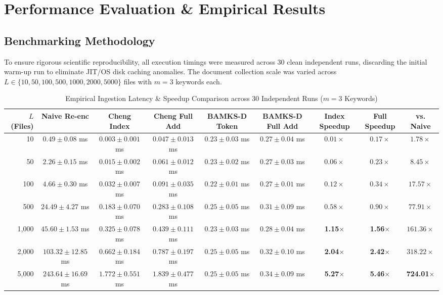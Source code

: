 \documentclass[journal,10pt,twocolumn]{IEEEtran}
\begin{document}
\section{Performance Evaluation \& Empirical Results}

\subsection{Benchmarking Methodology}
To ensure rigorous scientific reproducibility, all execution timings were measured across 30 clean independent runs, discarding the initial warm-up run to eliminate JIT/OS disk caching anomalies. The document collection scale was varied across $L \in \{10, 50, 100, 500, 1000, 2000, 5000\}$ files with $m = 3$ keywords each.

\begin{table}[t]
\caption{Empirical Ingestion Latency \& Speedup Comparison across 30 Independent Runs ($m = 3$ Keywords)}
\label{tab:benchmarks}
\centering
\begin{tabular}{rcccccccc}
\toprule
\textbf{$L$ (Files)} & \textbf{Naive Re-enc} & \textbf{Cheng Index \cite{cheng2026bamks}} & \textbf{Cheng Full Add} & \textbf{BAMKS-D Token} & \textbf{BAMKS-D Full Add} & \textbf{Index Speedup} & \textbf{Full Speedup} & \textbf{vs. Naive} \\
\midrule
10 & $0.49 \pm 0.08$ ms & $0.003 \pm 0.001$ ms & $0.047 \pm 0.013$ ms & $0.23 \pm 0.03$ ms & $0.27 \pm 0.04$ ms & $0.01\times$ & $0.17\times$ & $1.78\times$ \\
50 & $2.26 \pm 0.15$ ms & $0.015 \pm 0.002$ ms & $0.061 \pm 0.012$ ms & $0.23 \pm 0.02$ ms & $0.27 \pm 0.03$ ms & $0.06\times$ & $0.23\times$ & $8.45\times$ \\
100 & $4.66 \pm 0.30$ ms & $0.032 \pm 0.007$ ms & $0.091 \pm 0.035$ ms & $0.22 \pm 0.01$ ms & $0.27 \pm 0.01$ ms & $0.12\times$ & $0.34\times$ & $17.57\times$ \\
500 & $24.49 \pm 4.27$ ms & $0.183 \pm 0.070$ ms & $0.283 \pm 0.108$ ms & $0.25 \pm 0.05$ ms & $0.31 \pm 0.09$ ms & $0.58\times$ & $0.90\times$ & $77.91\times$ \\
1,000 & $45.60 \pm 1.53$ ms & $0.325 \pm 0.078$ ms & $0.439 \pm 0.111$ ms & $0.23 \pm 0.03$ ms & $0.28 \pm 0.04$ ms & \textbf{1.15$\times$} & \textbf{1.56$\times$} & $161.36\times$ \\
2,000 & $103.32 \pm 12.85$ ms & $0.662 \pm 0.184$ ms & $0.787 \pm 0.197$ ms & $0.25 \pm 0.05$ ms & $0.32 \pm 0.10$ ms & \textbf{2.04$\times$} & \textbf{2.42$\times$} & $318.22\times$ \\
5,000 & $243.64 \pm 16.69$ ms & $1.772 \pm 0.551$ ms & $1.839 \pm 0.477$ ms & $0.25 \pm 0.05$ ms & $0.34 \pm 0.09$ ms & \textbf{5.27$\times$} & \textbf{5.46$\times$} & \textbf{724.01$\times$} \\
\bottomrule
\end{tabular}
\end{table}
\end{document}
